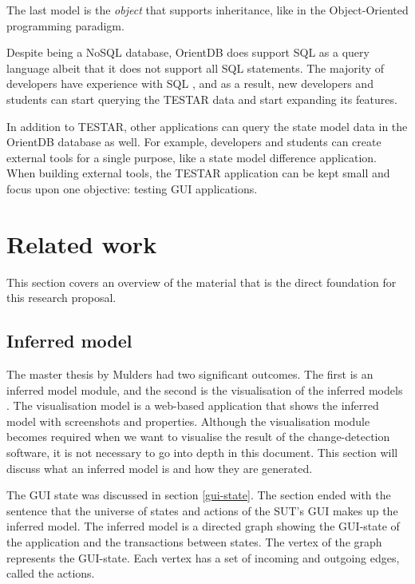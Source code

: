 The last model is the \hypertarget{db:object}{\emph{object}} that supports inheritance, like in the Object-Oriented programming paradigm.\par

Despite being a NoSQL database, OrientDB does support SQL as a query language \cite{sql-lang} albeit that it does not support all SQL statements. The majority of developers have experience with SQL \cite{sql-stats}, and as a result, new developers and students can start querying the TESTAR data and start expanding its features.\par

In addition to TESTAR, other applications can query the state model data in the OrientDB database as well. For example, developers and students can create external tools for a single purpose, like a state model difference application. When building external tools, the TESTAR application can be kept small and focus upon one objective: testing GUI applications. 

\section{Related work} \label{releatedWork}
This section covers an overview of the material that is the direct foundation for this research proposal.

\subsection{Inferred model} \label{inferred-model}
The master thesis by Mulders had two significant outcomes. The first is an inferred model module, and the second is the visualisation of the inferred models \cite{thesisMulders}. The visualisation model is a web-based application that shows the inferred model with screenshots and properties. Although the visualisation module becomes required when we want to visualise the result of the change-detection software, it is not necessary to go into depth in this document. This section will discuss what an inferred model is and how they are generated. 

The GUI state was discussed in section \ref{gui-state}. The section ended with the sentence that the universe of states and actions of the SUT's GUI makes up the inferred model. The inferred model is a directed graph showing the GUI-state of the application and the transactions between states. The vertex of the graph represents the GUI-state. Each vertex has a set of incoming and outgoing edges, called the actions. 

